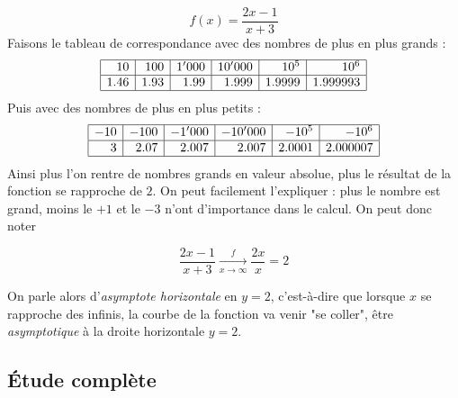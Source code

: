 \begin{exemple}
$$
f(x) = \frac{2x-1}{x+3}
$$
Faisons le tableau de correspondance avec des nombres de plus en plus grands :
$$
\begin{array}{|r|r|r|r|r|r|}
\hline
10 & 100 & 1'000 & 10'000 & 10^5& 10^6\\
\hline
1.46 &  1.93 & 1.99 & 1.999 & 1.9999&1.999993\\
\hline
\end{array}
$$
Puis avec des nombres de plus en plus petits :
$$
\begin{array}{|r|r|r|r|r|r|}
\hline
-10 & -100 & -1'000 & -10'000 & -10^5& -10^6\\
\hline
3 & 2.07 & 2.007 & 2.007 & 2.0001 & 2.000007\\
\hline
\end{array}
$$
Ainsi plus l'on rentre de nombres grands en valeur absolue, plus le résultat de la fonction se rapproche de $2$. On peut facilement l'expliquer : plus le nombre est grand, moins le $+1$ et le $-3$ n'ont d'importance dans le calcul. On peut donc noter

$$
\frac{2x-1}{x+3}\underset{x\rightarrow \infty}{\overset{f}{\longrightarrow}} \frac{2x}{x} = 2
$$

On parle alors d'\emph{asymptote horizontale} en $y = 2$, c'est-à-dire que lorsque $x$ se rapproche des infinis, la courbe de la fonction va venir "se coller", être \emph{asymptotique} à la droite horizontale $y=2$.
\end{exemple}

\subsection{Étude complète}

